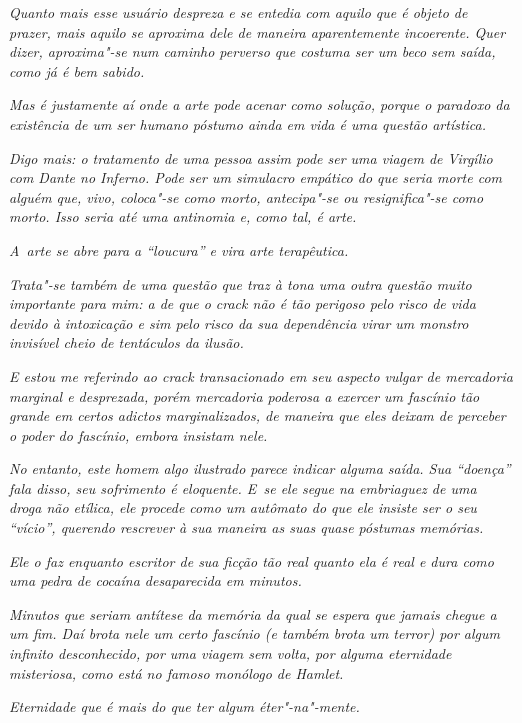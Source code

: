 \emph{Quanto mais esse usuário despreza e se entedia com aquilo que é
objeto de prazer, mais aquilo se aproxima dele de maneira aparentemente
incoerente. Quer dizer, aproxima"-se num caminho perverso que costuma ser
um beco sem saída, como já é bem sabido.}

\emph{Mas é justamente aí onde a arte pode acenar como solução, porque o
paradoxo da existência de um ser humano póstumo ainda em vida é uma
questão artística.}

\emph{Digo mais: o tratamento de uma pessoa assim pode ser uma viagem de
Virgílio com Dante no Inferno. Pode ser um simulacro empático do que
seria morte com alguém que, vivo, coloca"-se como morto, antecipa"-se ou
resignifica"-se como morto. Isso seria até uma antinomia e, como tal, é
arte.}

\emph{A~arte se abre para a ``loucura'' e vira arte terapêutica.}

\emph{Trata"-se também de uma questão que traz à tona uma outra questão
muito importante para mim: a de que o crack não é tão perigoso pelo
risco de vida devido à intoxicação e sim pelo risco da sua dependência
virar um monstro invisível cheio de tentáculos da ilusão.}

\emph{E estou me referindo ao crack transacionado em seu aspecto vulgar
de mercadoria marginal e desprezada, porém mercadoria poderosa a exercer
um fascínio tão grande em certos adictos marginalizados, de maneira que
eles deixam de perceber o poder do fascínio, embora insistam nele.}

\emph{No entanto, este homem algo ilustrado parece indicar alguma saída.
Sua ``doença'' fala disso, seu sofrimento é eloquente. E~se ele segue na
embriaguez de uma droga não etílica, ele procede como um autômato do que
ele insiste ser o seu ``vício'', querendo rescrever à sua maneira as
suas quase póstumas memórias.}

\emph{Ele o faz enquanto escritor de sua ficção tão real quanto ela é
real e dura como uma pedra de cocaína desaparecida em minutos.}

\emph{Minutos que seriam antítese da memória da qual se espera que
jamais chegue a um fim. Daí brota nele um certo fascínio (e também brota
um terror) por algum infinito desconhecido, por uma viagem sem volta,
por alguma eternidade misteriosa, como está no famoso monólogo de
Hamlet.}

\emph{Eternidade que é mais do que ter algum éter"-na"-mente.}
\endgroup